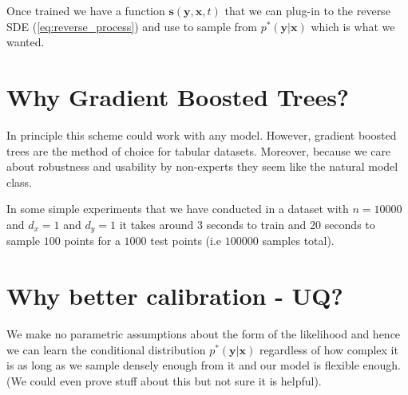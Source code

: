 Once trained we have a function $\mathbf{s}(\mathbf{y}, \mathbf{x}, t)$ that we can plug-in to the reverse SDE
(\ref{eq:reverse_process}) and use to sample from $p^*(\mathbf{y}|\mathbf{x})$ which is what we wanted.


\section{Why Gradient Boosted Trees?}
In principle this scheme could work with any model.
However, gradient boosted trees are the method of choice for tabular datasets.
Moreover, because we care about robustness and usability by non-experts
they seem like the natural model class.

In some simple experiments that we have conducted in a dataset with $n=10000$ and $d_x=1$ and $d_y=1$
it takes around 3 seconds to train and 20 seconds to sample $100$ points for a $1000$ test points
(i.e $100000$ samples total).

\section{Why better calibration - UQ?}
We make no parametric assumptions about the form of the likelihood
and hence we can learn the conditional distribution $p^*(\mathbf{y}|\mathbf{x})$
regardless of how complex it is as long as we sample densely enough from it and our
model is flexible enough.(We could even prove stuff about this but not sure it is helpful).
